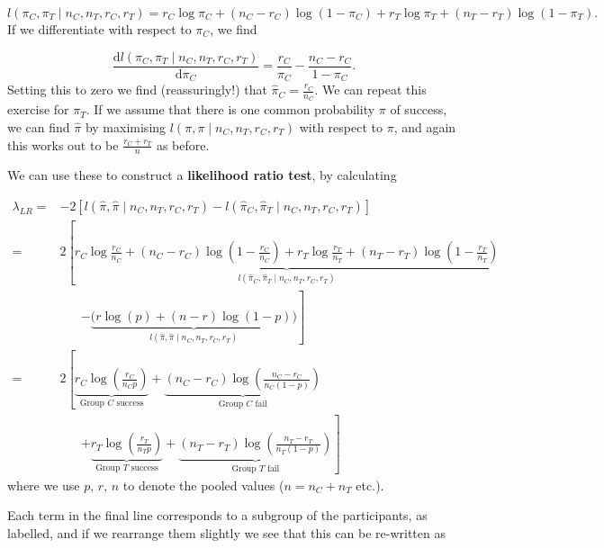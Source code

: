 \documentclass[
  openany]{book}
\theoremstyle{definition}
\theoremstyle{definition}
\theoremstyle{definition}
\theoremstyle{definition}
\theoremstyle{remark}
\begin{document}
\[ l\left( \pi_C,\pi_T \mid {n_C,n_T, r_C, r_T}\right) = r_C\log\pi_C + \left(n_C-r_C\right)\log\left(1-\pi_C\right) + r_T\log\pi_T + \left(n_T-r_T\right)\log\left(1-\pi_T\right).\]
If we differentiate with respect to \(\pi_C\), we find

\[\frac{\mathrm{d} l\left( \pi_C,\pi_T \mid {n_C,n_T, r_C, r_T}\right)}{\mathrm{d}\pi_C} = \frac{r_C}{\pi_C} - \frac{n_C-r_C}{1-\pi_C}.\]
Setting this to zero we find (reassuringly!) that \(\hat\pi_C = \frac{r_C}{n_C}\). We can repeat this exercise for \(\pi_T\). If we assume that there is one common probability \(\pi\) of success, we can find \(\hat\pi\) by maximising
\(l\left(\pi,\pi \mid {n_C,n_T, r_C, r_T}\right)\) with respect to \(\pi\), and again this works out to be \(\frac{r_{C} + r_T}{n}\) as before.

We can use these to construct a \textbf{likelihood ratio test}, by calculating

\[
\begin{aligned}
\lambda_{LR} = & -2\left[l\left( \hat\pi,\hat\pi \mid {n_C,n_T, r_C, r_T}\right) - l\left( \hat\pi_C,\hat\pi_T \mid {n_C,n_T, r_C, r_T}\right)\right]\\
 =  & 2\left[\underbrace{r_C\log\frac{r_C}{n_C} + \left(n_C-r_C\right)\log\left(1-\frac{r_C}{n_C}\right) + r_T\log\frac{r_T}{n_T} + \left(n_T-r_T\right)\log\left(1-\frac{r_T}{n_T}\right) }_{l\left( \hat\pi_C,\hat\pi_T \mid {n_C,n_T, r_C, r_T}\right)} \right. \\
&\;\;\;\;\;\; \left. - \underbrace{\Big(r\log\left(p\right) + \left(n-r\right)\log\left(1-p\right)\Big)}_{l\left( \hat\pi,\hat\pi \mid {n_C,n_T, r_C, r_T}\right)}\right]\\
 =& 2\left[\underbrace{r_C \log\left(\frac{r_C}{n_C p}\right)}_{\text{Group }C\text{ success}} + \underbrace{\left(n_C - r_C\right)\log\left(\frac{n_C - r_C}{n_C\left(1-p\right)}\right)}_{\text{Group }C\text{ fail}} \right.\\
 & \;\;\;\;\;\; \left.+ \underbrace{r_T \log\left(\frac{r_T}{n_T p}\right)}_{\text{Group }T\text{ success}} + \underbrace{\left(n_T - r_T\right)\log\left(\frac{n_T - r_T}{n_T\left(1-p\right)}\right)}_{\text{Group }T\text{ fail}}\right]
\end{aligned}
\]
where we use \(p,\, r,\, n\) to denote the pooled values (\(n = n_C + n_T\) etc.).

Each term in the final line corresponds to a subgroup of the participants, as labelled, and if we rearrange them slightly we see that this can be re-written as
\end{document}
